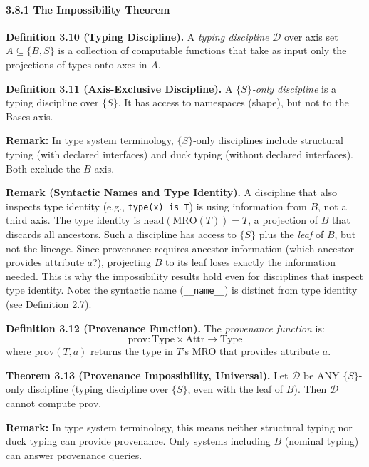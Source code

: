 \paragraph{3.8.1 The Impossibility
Theorem}\label{the-impossibility-theorem}

\textbf{Definition 3.10 (Typing Discipline).} A \emph{typing discipline}
\(\mathcal{D}\) over axis set \(A \subseteq \{B, S\}\) is a
collection of computable functions that take as input only the
projections of types onto axes in \(A\).

\textbf{Definition 3.11 (Axis-Exclusive Discipline).}
A \emph{$\{S\}$-only discipline} is a typing discipline over \(\{S\}\). It
has access to namespaces (shape), but not to the Bases axis.

\textbf{Remark:} In type system terminology, $\{S\}$-only disciplines include structural typing (with declared interfaces) and duck typing (without declared interfaces). Both exclude the $B$ axis.

\textbf{Remark (Syntactic Names and Type Identity).} A discipline that also inspects type identity (e.g., \texttt{type(x) is T}) is using information from $B$, not a third axis. The type identity is $\text{head}(\text{MRO}(T)) = T$, a projection of $B$ that discards all ancestors. Such a discipline has access to $\{S\}$ plus the \emph{leaf} of $B$, but not the lineage. Since provenance requires ancestor information (which ancestor provides attribute $a$?), projecting $B$ to its leaf loses exactly the information needed. This is why the impossibility results hold even for disciplines that inspect type identity. Note: the syntactic name (\texttt{\_\_name\_\_}) is distinct from type identity (see Definition 2.7).

\textbf{Definition 3.12 (Provenance Function).} The \emph{provenance
function} is:
\[\text{prov} : \text{Type} \times \text{Attr} \to \text{Type}\] where
\(\text{prov}(T, a)\) returns the type in \(T\)'s MRO that provides
attribute \(a\).

\textbf{Theorem 3.13 (Provenance Impossibility, Universal).}\label{thm:provenance-impossibility}
Let
\(\mathcal{D}\) be ANY $\{S\}$-only discipline (typing discipline over
\(\{S\}\), even with the leaf of \(B\)). Then \(\mathcal{D}\) cannot compute \(\text{prov}\).

\textbf{Remark:} In type system terminology, this means neither structural typing nor duck typing can provide provenance. Only systems including $B$ (nominal typing) can answer provenance queries.

